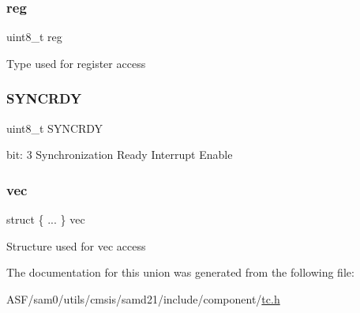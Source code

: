 \subsubsection{\texorpdfstring{reg}{reg}}
{\footnotesize\ttfamily uint8\+\_\+t reg}

Type used for register access \mbox{\label{union_t_c___i_n_t_e_n_c_l_r___type_aece75e176e4fd55bf68937f1b56bde63}} 
\subsubsection{\texorpdfstring{SYNCRDY}{SYNCRDY}}
{\footnotesize\ttfamily uint8\+\_\+t S\+Y\+N\+C\+R\+DY}

bit\+: 3 Synchronization Ready Interrupt Enable \mbox{\label{union_t_c___i_n_t_e_n_c_l_r___type_a7ddad38bdf6795eca00ad56c9708752f}} 
\subsubsection{\texorpdfstring{vec}{vec}}
{\footnotesize\ttfamily struct \{ ... \}   vec}

Structure used for vec access 

The documentation for this union was generated from the following file\+:\begin{DoxyCompactItemize}
\item 
A\+S\+F/sam0/utils/cmsis/samd21/include/component/\mbox{\hyperlink{utils_2cmsis_2samd21_2include_2component_2tc_8h}{tc.\+h}}\end{DoxyCompactItemize}
